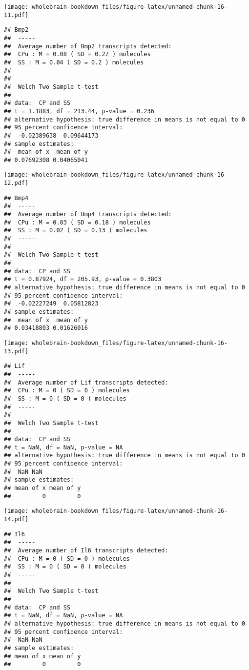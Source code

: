 \documentclass[]{book}
\theoremstyle{definition}
\theoremstyle{definition}
\theoremstyle{remark}
\begin{document}
\texttt{[image: wholebrain-bookdown\_files/figure-latex/unnamed-chunk-16-11.pdf]}

\begin{verbatim}
## Bmp2
##  -----
##  Average number of Bmp2 transcripts detected:
##  CPu : M = 0.08 ( SD = 0.27 ) molecules 
##  SS : M = 0.04 ( SD = 0.2 ) molecules
##  -----
## 
##  Welch Two Sample t-test
## 
## data:  CP and SS
## t = 1.1883, df = 213.44, p-value = 0.236
## alternative hypothesis: true difference in means is not equal to 0
## 95 percent confidence interval:
##  -0.02389638  0.09644173
## sample estimates:
##  mean of x  mean of y 
## 0.07692308 0.04065041
\end{verbatim}

\texttt{[image: wholebrain-bookdown\_files/figure-latex/unnamed-chunk-16-12.pdf]}

\begin{verbatim}
## Bmp4
##  -----
##  Average number of Bmp4 transcripts detected:
##  CPu : M = 0.03 ( SD = 0.18 ) molecules 
##  SS : M = 0.02 ( SD = 0.13 ) molecules
##  -----
## 
##  Welch Two Sample t-test
## 
## data:  CP and SS
## t = 0.87924, df = 205.93, p-value = 0.3803
## alternative hypothesis: true difference in means is not equal to 0
## 95 percent confidence interval:
##  -0.02227249  0.05812823
## sample estimates:
##  mean of x  mean of y 
## 0.03418803 0.01626016
\end{verbatim}

\texttt{[image: wholebrain-bookdown\_files/figure-latex/unnamed-chunk-16-13.pdf]}

\begin{verbatim}
## Lif
##  -----
##  Average number of Lif transcripts detected:
##  CPu : M = 0 ( SD = 0 ) molecules 
##  SS : M = 0 ( SD = 0 ) molecules
##  -----
## 
##  Welch Two Sample t-test
## 
## data:  CP and SS
## t = NaN, df = NaN, p-value = NA
## alternative hypothesis: true difference in means is not equal to 0
## 95 percent confidence interval:
##  NaN NaN
## sample estimates:
## mean of x mean of y 
##         0         0
\end{verbatim}

\texttt{[image: wholebrain-bookdown\_files/figure-latex/unnamed-chunk-16-14.pdf]}

\begin{verbatim}
## Il6
##  -----
##  Average number of Il6 transcripts detected:
##  CPu : M = 0 ( SD = 0 ) molecules 
##  SS : M = 0 ( SD = 0 ) molecules
##  -----
## 
##  Welch Two Sample t-test
## 
## data:  CP and SS
## t = NaN, df = NaN, p-value = NA
## alternative hypothesis: true difference in means is not equal to 0
## 95 percent confidence interval:
##  NaN NaN
## sample estimates:
## mean of x mean of y 
##         0         0
\end{verbatim}
\end{document}
